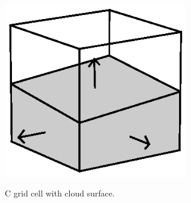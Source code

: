 \documentclass[12pt]{article}
\begin{document}



{}
{\clearpage}




\begin{figure}[t]
  \noindent\includegraphics[width=19pc,angle=0]{./figures/cell_diagram.eps}\\
  \caption{C grid cell with cloud surface.}\label{fig:cell_diagram}
\end{figure}
\end{document}
